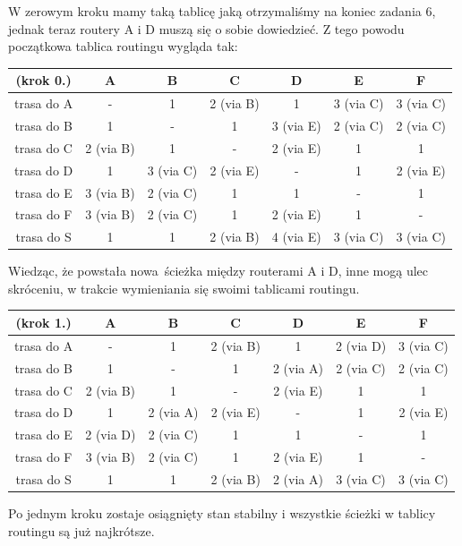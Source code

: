 \documentclass[a4paper,12pt]{article}
\begin{document}
\noindent W zerowym kroku mamy taką tablicę jaką otrzymaliśmy na koniec zadania 6, 
jednak teraz routery A i D muszą się o sobie dowiedzieć. Z tego powodu początkowa 
tablica routingu wygląda tak:

\begin{center}
    \begin{tabular}{|c|c|c|c|c|c|c|}
        \hline
        (krok 0.)   & A         & B         & C         & D         & E         & F         \\ \hline
        trasa do A  & -         & 1         & 2 (via B) & 1         & 3 (via C) & 3 (via C) \\ \hline
        trasa do B  & 1         & -         & 1         & 3 (via E) & 2 (via C) & 2 (via C) \\ \hline
        trasa do C  & 2 (via B) & 1         & -         & 2 (via E) & 1         & 1         \\ \hline
        trasa do D  & 1         & 3 (via C) & 2 (via E) & -         & 1         & 2 (via E) \\ \hline
        trasa do E  & 3 (via B) & 2 (via C) & 1         & 1         & -         & 1         \\ \hline
        trasa do F  & 3 (via B) & 2 (via C) & 1         & 2 (via E) & 1         & -         \\ \hline
        trasa do S  & 1         & 1         & 2 (via B) & 4 (via E) & 3 (via C) & 3 (via C) \\ \hline
    \end{tabular}
\end{center}

\noindent Wiedząc, że powstała nowa ścieżka między routerami A i D, inne mogą
ulec skróceniu, w trakcie wymieniania się swoimi tablicami routingu.

\begin{center}
    \begin{tabular}{|c|c|c|c|c|c|c|}
        \hline
        (krok 1.)   & A         & B         & C         & D         & E         & F         \\ \hline
        trasa do A  & -         & 1         & 2 (via B) & 1         & 2 (via D) & 3 (via C) \\ \hline
        trasa do B  & 1         & -         & 1         & 2 (via A) & 2 (via C) & 2 (via C) \\ \hline
        trasa do C  & 2 (via B) & 1         & -         & 2 (via E) & 1         & 1         \\ \hline
        trasa do D  & 1         & 2 (via A) & 2 (via E) & -         & 1         & 2 (via E) \\ \hline
        trasa do E  & 2 (via D) & 2 (via C) & 1         & 1         & -         & 1         \\ \hline
        trasa do F  & 3 (via B) & 2 (via C) & 1         & 2 (via E) & 1         & -         \\ \hline
        trasa do S  & 1         & 1         & 2 (via B) & 2 (via A) & 3 (via C) & 3 (via C) \\ \hline
    \end{tabular}
\end{center}

\noindent Po jednym kroku zostaje osiągnięty stan stabilny i wszystkie ścieżki
w tablicy routingu są już najkrótsze.
\end{document}

